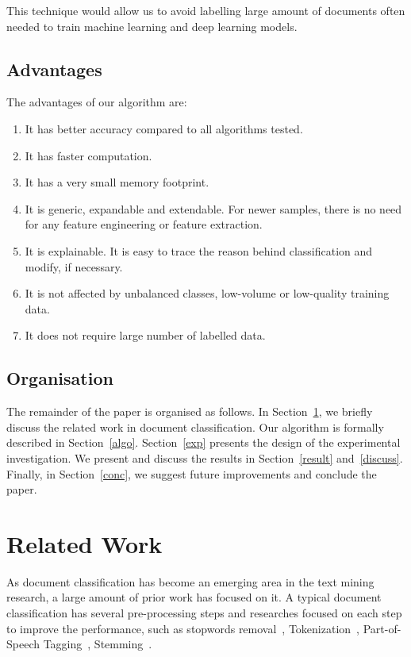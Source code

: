 \documentclass[runningheads]{llncs}
\begin{document}
\begin{remark}
This technique would allow us to avoid labelling large amount of documents often needed to train machine learning and deep learning models.
\end{remark}

\subsection{Advantages}
The advantages of our algorithm are:
\begin{enumerate}
\item It has better accuracy compared to all algorithms tested.
\item It has faster computation.
\item It has a very small memory footprint.
\item It is generic, expandable and extendable. For newer samples, there is no need for any feature engineering or feature extraction.
\item It is explainable. It is easy to trace the reason behind classification and modify, if necessary. 
\item It is not affected by unbalanced classes, low-volume or low-quality training data.
\item It does not require large number of labelled data.
\end{enumerate}

\subsection{Organisation}
The remainder of the paper is organised as follows. In Section~\ref{work}, we briefly discuss the related work in document classification. Our algorithm is formally described in Section~\ref{algo}. Section~\ref{exp} presents the design of the experimental investigation. We present and discuss the results in Section~\ref{result} and~\ref{discuss}. Finally, in Section~\ref{conc}, we suggest future improvements and conclude the paper.

\section{Related Work}\label{work}
As document classification has become an emerging area in the text mining research, a large amount of prior work has focused on it. A typical document classification has several pre-processing steps and researches focused on each step to improve the performance, such as stopwords removal~\cite{manalu2017,prathibha2015}, Tokenization~\cite{bakar2014,gadri2015}, Part-of-Speech Tagging~\cite{owoputi2012}, Stemming~\cite{zhang2007}.
\end{document}
